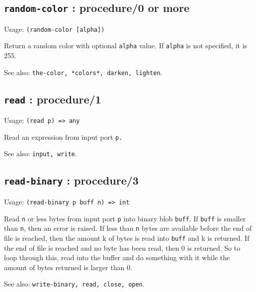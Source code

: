 \documentclass[
]{article}
\newcommand{\passthrough}[1]{#1}
\begin{document}
\hypertarget{random-color-procedure0-or-more-1}{%
\subsection{\texorpdfstring{\texttt{random-color} : procedure/0 or
more}{random-color : procedure/0 or more}}\label{random-color-procedure0-or-more-1}}

Usage: \passthrough{\lstinline!(random-color [alpha])!}

Return a random color with optional \passthrough{\lstinline!alpha!}
value. If \passthrough{\lstinline!alpha!} is not specified, it is 255.

See also:
\passthrough{\lstinline!the-color, *colors*, darken, lighten!}.

\hypertarget{read-procedure1-1}{%
\subsection{\texorpdfstring{\texttt{read} :
procedure/1}{read : procedure/1}}\label{read-procedure1-1}}

Usage: \passthrough{\lstinline!(read p) => any!}

Read an expression from input port \passthrough{\lstinline!p.!}

See also: \passthrough{\lstinline!input, write!}.

\hypertarget{read-binary-procedure3-1}{%
\subsection{\texorpdfstring{\texttt{read-binary} :
procedure/3}{read-binary : procedure/3}}\label{read-binary-procedure3-1}}

Usage: \passthrough{\lstinline!(read-binary p buff n) => int!}

Read \passthrough{\lstinline!n!} or less bytes from input port
\passthrough{\lstinline!p!} into binary blob
\passthrough{\lstinline!buff!}. If \passthrough{\lstinline!buff!} is
smaller than \passthrough{\lstinline!n!}, then an error is raised. If
less than \passthrough{\lstinline!n!} bytes are available before the end
of file is reached, then the amount k of bytes is read into
\passthrough{\lstinline!buff!} and k is returned. If the end of file is
reached and no byte has been read, then 0 is returned. So to loop
through this, read into the buffer and do something with it while the
amount of bytes returned is larger than 0.

See also: \passthrough{\lstinline!write-binary, read, close, open!}.
\end{document}
